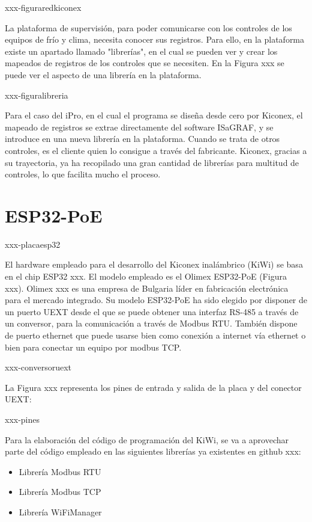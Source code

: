 xxx-figuraredkiconex

La plataforma de supervisión, para poder comunicarse con los controles de los equipos de frío y clima, necesita conocer sus registros. Para ello, en la plataforma existe un apartado llamado "librerías", en el cual se pueden ver y crear los mapeados de registros de los controles que se necesiten. En la Figura xxx se puede ver el aspecto de una librería en la plataforma.

xxx-figuralibreria

Para el caso del iPro, en el cual el programa se diseña desde cero por Kiconex, el mapeado de registros se extrae directamente del software ISaGRAF, y se introduce en una nueva librería en la plataforma. Cuando se trata de otros controles, es el cliente quien lo consigue a través del fabricante. Kiconex, gracias a su trayectoria, ya ha recopilado una gran cantidad de librerías para multitud de controles, lo que facilita mucho el proceso.

\section{ESP32-PoE}
\label{sec:esp32poe}

xxx-placaesp32

El hardware empleado para el desarrollo del Kiconex inalámbrico (KiWi) se basa en el chip ESP32 xxx. El modelo empleado es el Olimex ESP32-PoE (Figura xxx). Olimex xxx es una empresa de Bulgaria líder en fabricación electrónica para el mercado integrado. Su modelo ESP32-PoE ha sido elegido por disponer de un puerto UEXT desde el que se puede obtener una interfaz RS-485 a través de un conversor, para la comunicación a través de Modbus RTU. También dispone de puerto ethernet que puede usarse bien como conexión a internet vía ethernet o bien para conectar un equipo por modbus TCP.

xxx-conversoruext

La Figura xxx representa los pines de entrada y salida de la placa y del conector UEXT:

xxx-pines

Para la elaboración del código de programación del KiWi, se va a aprovechar parte del código empleado en las siguientes librerías ya existentes en github xxx:

\begin{itemize}
  \item Librería Modbus RTU  
  \item Librería Modbus TCP 
  \item Librería WiFiManager
\end{itemize}

